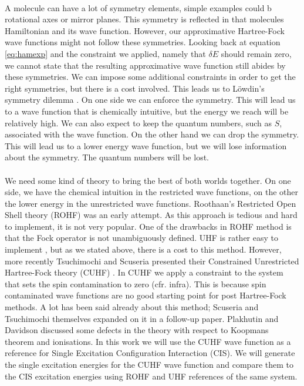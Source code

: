 \documentclass[twoside,twocolumn,9pt]{article}
\begin{document}
\paragraph*{}
A molecule can have a lot of symmetry elements, simple examples could b rotational axes or mirror planes. This symmetry is reflected in that molecules Hamiltonian and its wave 
function.
However, our approximative Hartree-Fock wave functions might not follow these symmetries. Looking back at equation \eqref{eq:hamexp} and 
the constraint we applied, namely that $\delta E$ should remain zero, we cannot state that the resulting approximative wave function still abides by these symmetries. 
We can impose some additional constraints in order to get the right symmetries, but there is a cost involved. This leads us to Löwdin's symmetry dilemma \cite{Lowdin1963}. 
On one side we can enforce the symmetry. This will lead us to a wave function that is chemically intuitive, but the energy we reach will be relatively high. We can also expect to 
keep the quantum numbers, such as $S$, associated with the wave function. On the other hand we can drop the symmetry. This will lead us to a lower energy wave function, but we will 
lose information about the symmetry. The quantum numbers will be lost.

\paragraph*{}
We need some kind of theory to bring the best of both worlds together. On one side, we have the chemical intuition in the restricted wave functions, on the other the lower
energy in the unrestricted wave functions. Roothaan's Restricted Open Shell theory (ROHF)\cite{Roothaan1960} was an early attempt. As this approach is tedious and hard to implement,
it is not very popular\cite{Scuseria2010, Bally2008}. One of the drawbacks in ROHF method is that the Fock operator is not unambiguously defined\cite{Scuseria2010, Plakhutin2014}. 
UHF is rather easy to implement \cite{Scuseria2010, Bally2008}, but as we stated above, there is a cost to this method.
However, more recently Tsuchimochi and Scuseria presented their Constrained Unrestricted Hartree-Fock theory (CUHF)
\cite{Scuseria2010}. In CUHF we apply a constraint to the system that sets the spin contamination to zero (cfr. infra). This is because spin contaminated wave functions are no
good starting point for post Hartree-Fock methods\cite{Scuseria2010}. A lot has been said
already about this method; Scuseria and Tsuchimochi themselves expanded on it in a follow-up paper\cite{Scuseria2011}. Plakhutin and Davidson discussed some defects in the theory 
with respect to
Koopmans theorem and ionisations\cite{Plakhutin2014}. In this work we will use the CUHF wave function as a reference for
Single Excitation Configuration Interaction (CIS). We will generate the single excitation energies for the CUHF wave function and compare them to the CIS excitation energies using
ROHF and UHF references of the same system. 
\end{document}
